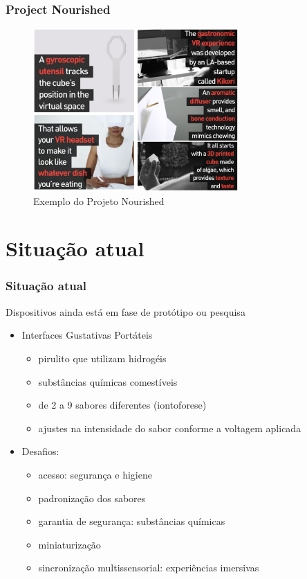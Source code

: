 \documentclass{beamer}
\begin{document}
\begin{frame}
  \frametitle{Project Nourished}
  \begin{figure}[h]
    \centering
    \caption{Exemplo do Projeto Nourished}
    \vspace{-8pt}
    \includegraphics[width=0.7\textwidth]{img_ProjectNourished.png}
  \end{figure}
\end{frame}

\section{Situação atual}
\begin{frame}
  \frametitle{Situação atual}
  Dispositivos ainda está em fase de protótipo ou pesquisa \\
  \begin{itemize}
    \item Interfaces Gustativas Portáteis
    \begin{itemize}
      \item pirulito que utilizam hidrogéis
      \item substâncias químicas comestíveis
      \item de 2 a 9 sabores diferentes (iontoforese)
      \item ajustes na intensidade do sabor conforme a voltagem aplicada
    \end{itemize}
    \item Desafios:
    \begin{itemize}
      \item acesso: segurança e higiene
      \item padronização dos sabores
      \item garantia de segurança: substâncias químicas
      \item miniaturização
      \item sincronização multissensorial: experiências imersivas
    \end{itemize}
  \end{itemize}
\end{frame}
\end{document}
